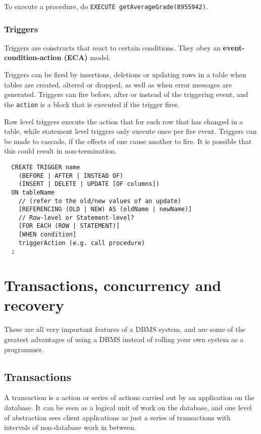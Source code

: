 To execute a procedure, do \texttt{EXECUTE getAverageGrade(8955942)}. 

\subsubsection{Triggers}

Triggers are constructs that react to certain conditions. They obey an \textbf
{event-condition-action (ECA)} model.

Triggers can be fired by insertions, deletions or updating rows in a table when
tables are created, altered or dropped, as well as when error messages are
generated. Triggers can fire before, after or instead of the triggering event,
and the \texttt{action} is a block that is executed if the trigger fires.

Row level triggers execute the action that for each row that has changed in a
table, while statement level triggers only execute once per fire event.
Triggers can be made to cascade, if the effects of one cause another to fire. It
is possible that this could result in non-termination.

\begin{verbatim}
  CREATE TRIGGER name
    (BEFORE | AFTER | INSTEAD OF)
    (INSERT | DELETE | UPDATE [OF columns])
  ON tableName
    // (refer to the old/new values of an update)
    [REFERENCING (OLD | NEW) AS (oldName | newName)]
    // Row-level or Statement-level?
    [FOR EACH (ROW | STATEMENT)]
    [WHEN condition]
    triggerAction (e.g. call procedure)
  ;
\end{verbatim}

\section{Transactions, concurrency and recovery}

These are all very important features of a DBMS system, and are some of the
greatest advantages of using a DBMS instead of rolling your own system as a
programmer.

\subsection{Transactions}

A transaction is a action or series of actions carried out by an application on
the database. It can be seen as a logical unit of work on the database, and one
level of abstraction sees client applications as just a series of transactions
with intervals of non-database work in between.


